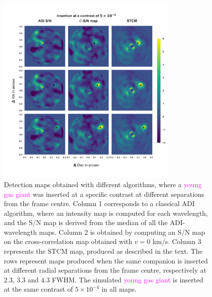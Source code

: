 \documentclass[referee]{aa} %
\newcommand{\newchange}[1]{\textcolor{magenta}{#1}}
\begin{document}
\begin{figure}%
    \centering
    \includegraphics[width=0.8\textwidth]{Fig1_Dec_highres_noinbetween.png}
    \caption{Detection maps obtained with different algorithms, where a \newchange{young gas giant} was inserted at a specific contrast at different separations from the frame centre. Column 1 corresponds to a classical ADI algorithm, where an intensity map is computed for each wavelength, and the S/N map is derived from the median of all the ADI-wavelength maps. Column 2 is obtained by computing an S/N map on the cross-correlation map obtained with $v=0$ km/s. Column 3 represents the STCM map, produced as described in the text. The rows represent maps produced when the same companion is inserted at different radial separations from the frame centre, respectively at $2.3$, $3.3$ and $4.3$ FWHM. %
    The simulated \newchange{young gas giant} is inserted at the same contrast of $5\times10^{-4}$ in all maps.}
    \label{fig:fig_1}
\end{figure}
\end{document}
